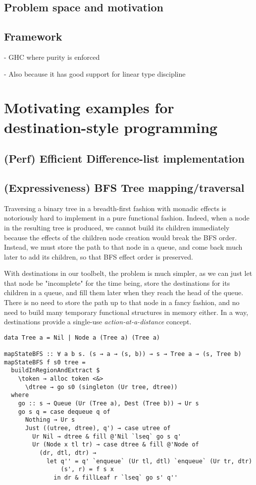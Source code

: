 \documentclass[english]{jflart}
\begin{document}
\subsection{Problem space and motivation}

\subsection{Framework}

- GHC where purity is enforced

- Also because it has good support for linear type discipline

\section{Motivating examples for destination-style programming}

\subsection{(Perf) Efficient Difference-list implementation}

\subsection{(Expressiveness) BFS Tree mapping/traversal}

Traversing a binary tree in a breadth-first fashion with monadic effects is notoriously hard to implement in a pure functional fashion. Indeed, when a node in the resulting tree is produced, we cannot build its children immediately because the effects of the children node creation would break the BFS order. Instead, we must store the path to that node in a queue, and come back much later to add its children, so that BFS effect order is preserved.

With destinations in our toolbelt, the problem is much simpler, as we can just let that node be "incomplete" for the time being, store the destinations for its children in a queue, and fill them later when they reach the head of the queue. There is no need to store the path up to that node in a fancy fashion, and no need to build many temporary functional structures in memory either. In a way, destinations provide a single-use \emph{action-at-a-distance} concept.

\begin{verbatim}
data Tree a = Nil | Node a (Tree a) (Tree a)

mapStateBFS :: ∀ a b s. (s → a → (s, b)) → s → Tree a → (s, Tree b)
mapStateBFS f s0 tree =
  buildInRegionAndExtract $
    \token → alloc token <&>
      \dtree → go s0 (singleton (Ur tree, dtree))
  where
    go :: s → Queue (Ur (Tree a), Dest (Tree b)) ⊸ Ur s
    go s q = case dequeue q of
      Nothing → Ur s
      Just ((utree, dtree), q') → case utree of
        Ur Nil → dtree & fill @'Nil `lseq` go s q'
        Ur (Node x tl tr) → case dtree & fill @'Node of
          (dr, dtl, dtr) →
            let q'' = q' `enqueue` (Ur tl, dtl) `enqueue` (Ur tr, dtr)
                (s', r) = f s x
              in dr & fillLeaf r `lseq` go s' q''
\end{verbatim}
\end{document}
